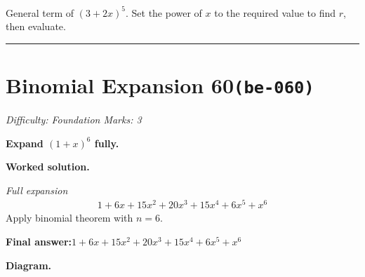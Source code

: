 \documentclass[11pt]{article}
\newcommand{\question}[1]{\par\medskip\noindent\textbf{#1}\par}
\begin{document}
\begin{center}
\end{center}
\small General term of $\left(3+2x\right)^{5}$. Set the power of $x$ to the required value to find $r$, then evaluate.\normalsize

\medskip\hrule

\section*{Binomial Expansion 60\quad\small\texttt{(be-060)}}
\textit{Difficulty: Foundation \quad\textbar\quad Marks: 3}

\question{Expand \( (1 + x)^6 \) fully.}

\textbf{Worked solution.}

\textit{Full expansion}
\[\begin{gathered}
1 + 6x + 15x^2 + 20x^3 + 15x^4 + 6x^5 + x^6
\end{gathered}\]
Apply binomial theorem with \( n = 6 \).

\begin{answerbox}
\textbf{Final answer:}\quad \(\displaystyle 1 + 6x + 15x^2 + 20x^3 + 15x^4 + 6x^5 + x^6\)
\end{answerbox}
\textbf{Diagram.}
\end{document}
